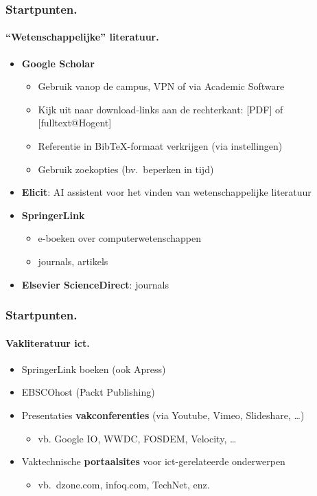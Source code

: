 \documentclass[aspectratio=169]{beamer}
\begin{document}
\begin{frame}
  \frametitle{Startpunten.}
  \framesubtitle{``Wetenschappelijke'' literatuur.}

  \begin{itemize}
    \item<+-> \textbf{Google Scholar}
      \begin{itemize}
        \item Gebruik vanop de campus, VPN of via Academic Software
        \item Kijk uit naar download-links aan de rechterkant: [PDF] of [fulltext@Hogent]
        \item Referentie in Bib{\TeX}-formaat verkrijgen (via instellingen)
        \item Gebruik zoekopties (bv.~beperken in tijd)
      \end{itemize}
    \item<+-> \textbf{Elicit}: AI assistent voor het vinden van wetenschappelijke literatuur
    \item<+-> \textbf{SpringerLink}
      \begin{itemize}
        \item e-boeken over computerwetenschappen
        \item journals, artikels
      \end{itemize}
    \item<+-> \textbf{Elsevier ScienceDirect}: journals
  \end{itemize}
\end{frame}

\begin{frame}
  \frametitle{Startpunten.}
  \framesubtitle{Vakliteratuur ict.}

  \begin{itemize}
    \item SpringerLink boeken (ook Apress)
    \item EBSCOhost (Packt Publishing)
    \item Presentaties \textbf{vakconferenties} (via Youtube, Vimeo, Slideshare, \dots)
          \begin{itemize}
            \item vb. Google IO, WWDC, FOSDEM, Velocity, \dots
          \end{itemize}
    \item<+-> Vaktechnische \textbf{portaalsites} voor ict-gerelateerde onderwerpen
      \begin{itemize}
        \item vb.~dzone.com, infoq.com, TechNet, enz.
      \end{itemize}
  \end{itemize}
\end{frame}
\end{document}
